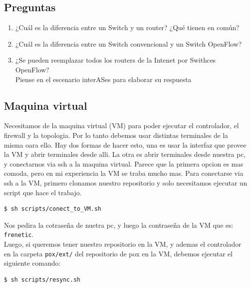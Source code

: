 \subsection{Preguntas}	
	\begin{enumerate}
		\item ¿Cuál es la diferencia entre un Switch y un router? ¿Qué tienen en común?
		\item ¿Cuál es la diferencia entre un Switch convencional y un Switch OpenFlow?
		\item ¿Se pueden reemplazar todos los routers de la Intenet por Swithces OpenFlow?\\
		Piense en el escenario interASes para elaborar su respuesta
	\end{enumerate}

\subsection{Maquina virtual}
	Necesitamos de la maquina virtual (VM) para poder ejecutar el controlador, el firewall y la topologia. Por lo tanto debemos usar 		distintas terminales de la misma oara ello. Hay dos formas de hacer esto, una es usar la interfaz que provee la VM y abrir terminales 		desde alli. La otra es abrir terminales desde nuestra pc, y conectarnos via ssh a la maquina virtual. Parece que la primera opcion es 		mas comoda, pero en mi experiencia la VM se traba mucho mas.
	Para conectarse via ssh a la VM, primero clonamos nuestro repositorio y solo necesitamos ejecutar un script que hace el trabajo.
	\begin{lstlisting}[language=bash,numbers=none]
	 	$ sh scripts/conect_to_VM.sh
	\end{lstlisting}	
	Nos pedira la cotraseña de nuetra pc, y luego la contraseña de la VM que es: \lstinline[columns=fixed]{frenetic}.\\
	Luego, si queremos tener nuestro repositorio en la VM, y ademas el controlador en la carpeta \lstinline[columns=fixed]{pox/ext/} del 		repositorio de pox en la VM, debemos ejecutar el siguiente comando:\\
	\begin{lstlisting}[language=bash,numbers=none]
		$ sh scripts/resync.sh
	\end{lstlisting}
